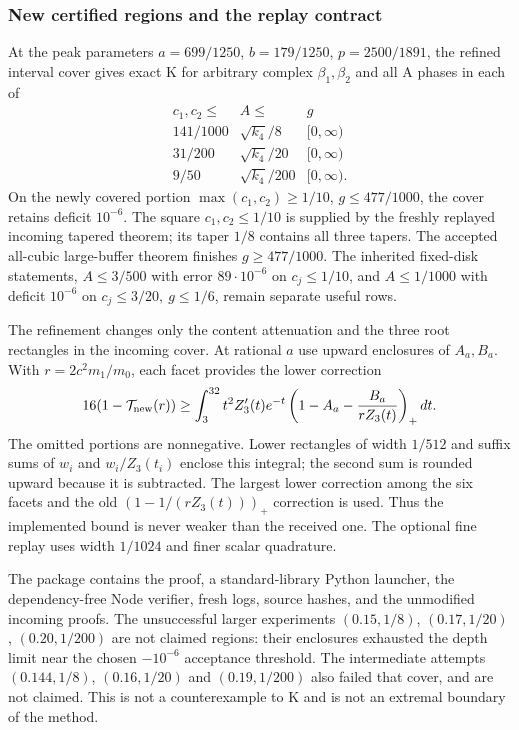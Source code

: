 \subsubsection{New certified regions and the replay contract}
\label{sec:kcompact-regions}
At the peak parameters $a=699/1250$, $b=179/1250$, $p=2500/1891$,
the refined interval cover gives exact K for arbitrary complex
$\beta_1,\beta_2$ and all A phases in each of
\[
\begin{array}{c|c|c}
 c_1,c_2\le & A\le & g\\ \hline
 141/1000 & \sqrt{k_4}/8 & [0,\infty)\\
 31/200 & \sqrt{k_4}/20 & [0,\infty)\\
 9/50 & \sqrt{k_4}/200 & [0,\infty).
\end{array}
\]
On the newly covered portion $\max(c_1,c_2)\ge1/10$,
$g\le477/1000$, the cover retains deficit $10^{-6}$.
The square $c_1,c_2\le1/10$ is supplied by the freshly replayed
incoming tapered theorem; its taper $1/8$ contains all three tapers.
The accepted all-cubic large-buffer theorem finishes $g\ge477/1000$.
The inherited fixed-disk statements, $A\le3/500$ with error
$89\cdot10^{-6}$ on $c_j\le1/10$, and $A\le1/1000$ with deficit
$10^{-6}$ on $c_j\le3/20,\ g\le1/6$, remain separate useful rows.

The refinement changes only the content attenuation and the three
root rectangles in the incoming cover. At rational $a$ use upward
enclosures of $A_a,B_a$. With $r=2c^2m_1/m_0$, each facet provides
the lower correction
\[
 16(1-\mathcal T_{\rm new}(r))
 \ge\int_3^{32}t^2Z_3'(t)e^{-t}
       \left(1-A_a-\frac{B_a}{rZ_3(t)}\right)_+dt.
\]
The omitted portions are nonnegative. Lower rectangles of width
$1/512$ and suffix sums of $w_i$ and $w_i/Z_3(t_i)$ enclose this
integral; the second sum is rounded upward because it is subtracted.
The largest lower correction among the six facets and the old
$(1-1/(rZ_3(t)))_+$ correction is used. Thus the implemented bound
is never weaker than the received one. The optional fine replay
uses width $1/1024$ and finer scalar quadrature.

The package contains the proof, a standard-library Python launcher,
the dependency-free Node verifier, fresh logs, source hashes, and
the unmodified incoming proofs. The unsuccessful larger experiments
$(0.15,1/8)$, $(0.17,1/20)$, $(0.20,1/200)$ are not claimed regions:
their enclosures exhausted the depth limit near the chosen
$-10^{-6}$ acceptance threshold. The intermediate attempts
$(0.144,1/8)$, $(0.16,1/20)$ and $(0.19,1/200)$ also failed that
cover, and are not claimed. This is not a counterexample to K
and is not an extremal boundary of the method.

